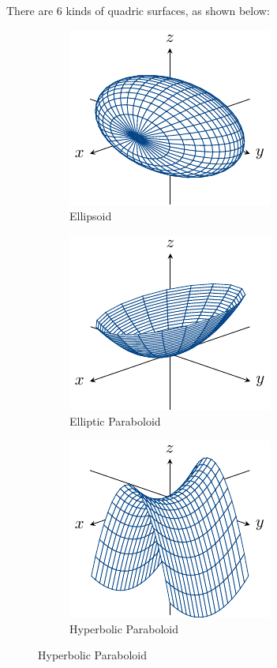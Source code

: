 \documentclass{book}
\theoremstyle{remark}
\begin{document}
There are 6 kinds of quadric surfaces, as shown below:
\begin{figure}[ht]

\centering

\begin{subfigure}{0.3\textwidth}
    \centering
    \includegraphics{figures/ellipsoid.pdf}
    \caption{Ellipsoid}
\end{subfigure}
\begin{subfigure}{0.3\textwidth}
    \centering
    \includegraphics{figures/elliptic_paraboloid.pdf}
    \caption{Elliptic Paraboloid}
\end{subfigure}
\begin{subfigure}{0.3\textwidth}
    \centering
    \includegraphics{figures/hyperbolic_paraboloid.pdf}
    \caption{Hyperbolic Paraboloid}
\end{subfigure}

\end{figure}
\end{document}

